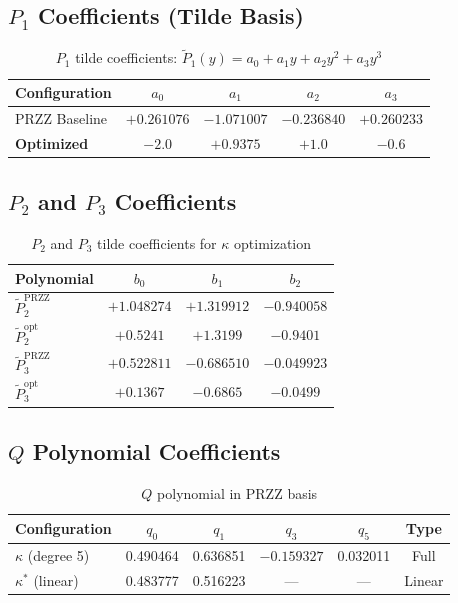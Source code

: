 \documentclass[11pt]{article}
\begin{document}
\subsection{$P_1$ Coefficients (Tilde Basis)}

\begin{table}[h]
\centering
\caption{$P_1$ tilde coefficients: $\tilde{P}_1(y) = a_0 + a_1 y + a_2 y^2 + a_3 y^3$}
\begin{tabular}{lcccc}
\toprule
Configuration & $a_0$ & $a_1$ & $a_2$ & $a_3$ \\
\midrule
PRZZ Baseline & $+0.261076$ & $-1.071007$ & $-0.236840$ & $+0.260233$ \\
\textbf{Optimized} & $\mathbf{-2.0}$ & $\mathbf{+0.9375}$ & $\mathbf{+1.0}$ & $\mathbf{-0.6}$ \\
\bottomrule
\end{tabular}
\end{table}

\subsection{$P_2$ and $P_3$ Coefficients}

\begin{table}[h]
\centering
\caption{$P_2$ and $P_3$ tilde coefficients for $\kappa$ optimization}
\begin{tabular}{lccc}
\toprule
Polynomial & $b_0$ & $b_1$ & $b_2$ \\
\midrule
$\tilde{P}_2^{\text{PRZZ}}$ & $+1.048274$ & $+1.319912$ & $-0.940058$ \\
$\tilde{P}_2^{\text{opt}}$ & $+0.5241$ & $+1.3199$ & $-0.9401$ \\
\midrule
$\tilde{P}_3^{\text{PRZZ}}$ & $+0.522811$ & $-0.686510$ & $-0.049923$ \\
$\tilde{P}_3^{\text{opt}}$ & $+0.1367$ & $-0.6865$ & $-0.0499$ \\
\bottomrule
\end{tabular}
\end{table}

\subsection{$Q$ Polynomial Coefficients}

\begin{table}[h]
\centering
\caption{$Q$ polynomial in PRZZ basis}
\begin{tabular}{lccccc}
\toprule
Configuration & $q_0$ & $q_1$ & $q_3$ & $q_5$ & Type \\
\midrule
$\kappa$ (degree 5) & 0.490464 & 0.636851 & $-0.159327$ & 0.032011 & Full \\
$\kappa^*$ (linear) & 0.483777 & 0.516223 & --- & --- & Linear \\
\bottomrule
\end{tabular}
\end{table}
\end{document}
